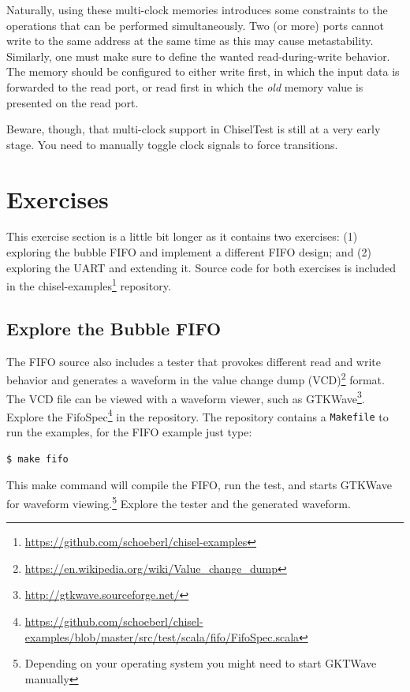 \documentclass[%
    10pt,
    headinclude, footexclude,
    openright, %
    notitlepage,
    cleardoubleempty,
    headsepline,
    pointlessnumbers,
    bibtotoc, idxtotoc,
    ]{scrbook}
\newcommand{\code}[1]{{\lstinline[basicstyle=\small\ttfamily]{#1}}}
\newcommand{\myref}[2]{\href{#1}{#2}}
\renewcommand{\myref}[2]{{#2}{\footnote{\url{#1}}}}
\begin{document}

Naturally, using these multi-clock memories introduces some constraints to the
operations that can be performed simultaneously. Two (or more) ports cannot
write to the same address at the same time as this may cause metastability.
Similarly, one must make sure to define the wanted read-during-write behavior.
The memory should be configured to either write first, in which the input data is
forwarded to the read port, or read first in which the \emph{old} memory value
is presented on the read port.

Beware, though, that multi-clock support in ChiselTest is still at a very early
stage. You need to manually toggle clock signals to force transitions.


\section{Exercises}

This exercise section is a little bit longer as it contains two exercises:
(1) exploring the bubble FIFO and implement a different FIFO design;
and (2) exploring the UART and extending it.
Source code for both exercises is included in the
\myref{https://github.com/schoeberl/chisel-examples}{chisel-examples} repository.

\subsection{Explore the Bubble FIFO}

The FIFO source also includes a tester that provokes different read and write behavior and generates a waveform in the
\myref{https://en.wikipedia.org/wiki/Value_change_dump}{value change dump (VCD)} format.
The VCD file can be viewed with a waveform viewer, such as
\myref{http://gtkwave.sourceforge.net/}{GTKWave}.
Explore the
\myref{https://github.com/schoeberl/chisel-examples/blob/master/src/test/scala/fifo/FifoSpec.scala}{FifoSpec} in the repository.
The repository contains a \code{Makefile} to run the examples, for the FIFO example
just type:
\begin{verbatim}
$ make fifo
\end{verbatim}
This make command will compile the FIFO, run the test, and starts GTKWave for waveform
viewing.\footnote{Depending on your operating system you might need to start GKTWave
manually} Explore the tester and the generated waveform.
\end{document}
